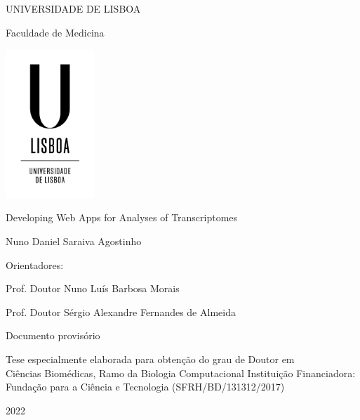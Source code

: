 \documentclass[12pt, twoside]{report}
\begin{document}
\begin{titlepage}
    \begin{center}
        \vspace*{-.2cm}
        UNIVERSIDADE DE LISBOA
        
        Faculdade de Medicina
        
        \includegraphics[width=0.25\textwidth]{images/logo/ulisboa-only}
        
        \vspace{1.8cm}
        Developing Web Apps for Analyses of Transcriptomes

        \vspace{1.1cm}        
            
        \vspace{0.9cm}            
        Nuno Daniel Saraiva Agostinho
    \end{center}

    \vspace{0.9cm}
    Orientadores:

      Prof. Doutor Nuno Luís Barbosa Morais

      Prof. Doutor Sérgio Alexandre Fernandes de Almeida
    
    \vspace{2cm}
    \begin{center}
        Documento provisório
        
        Tese especialmente elaborada para obtenção do grau de Doutor em\\
        Ciências Biomédicas, Ramo da Biologia Computacional    
        \vfill
        Instituição Financiadora:
        Fundação para a Ciência e Tecnologia (SFRH/BD/131312/2017)
        
        2022
        \vspace{.7cm}    
    \end{center}
\end{titlepage}
\end{document}
